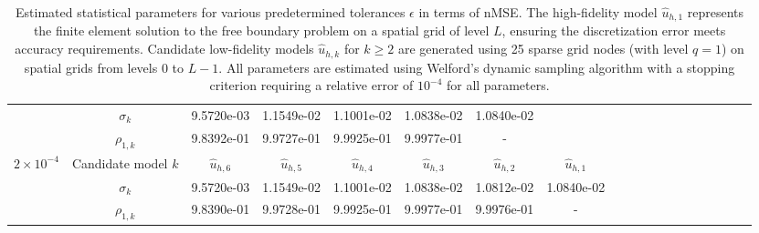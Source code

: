 \begin{table}[ht]
{\begin{tabular}{|c|c|c|c|c|c|c|c|c|c|c|c|c|c|c|c|c|c|c|}
 \cline{2-7}	
&\multicolumn{1}{|c|}{$\sigma_{k}$}&9.5720e-03   &1.1549e-02   &1.1001e-02   &1.0838e-02   &1.0840e-02  &\\
\cline{2-7}	
&\multicolumn{1}{|c|}{$\rho_{1,k}$}&9.8392e-01 &9.9727e-01 &9.9925e-01 &9.9977e-01 &- &\\
\hline
\hline
\multirow{3}{*}{$2\times 10^{-4}$} &\multicolumn{1}{|c|}{Candidate model $k$} &$\widehat u_{h,6}$&$\widehat u_{h,5}$&$\widehat u_{h,4}$&$\widehat u_{h,3}$&$\widehat u_{h,2}$&$\widehat u_{h,1}$\\
\cline{2-8}
&\multicolumn{1}{|c|}{$\sigma_{k}$}&9.5720e-03   &1.1549e-02   &1.1001e-02   &1.0838e-02   &1.0812e-02  &1.0840e-02\\
\cline{2-8}	
&\multicolumn{1}{|c|}{$\rho_{1,k}$}&9.8390e-01   &9.9728e-01   &9.9925e-01   &9.9977e-01   &9.9976e-01   &-\\
\hline
\end{tabular}}
\caption{Estimated statistical parameters for various predetermined tolerances $\epsilon$ in terms of nMSE. The high-fidelity model $\widehat u_{h,1}$ represents the finite element solution to the free boundary problem on a spatial grid of level $L$, ensuring the discretization error meets accuracy requirements. Candidate low-fidelity models $\widehat u_{h,k}$ for $k \geq 2$ are generated using 25 sparse grid nodes (with level $q=1$) on spatial grids from levels 0 to $L-1$. All parameters are estimated using Welford's dynamic sampling algorithm with a stopping criterion requiring a relative error of $10^{-4}$ for all parameters.}
\label{Tab:MFMC_parameters}
\end{table}
%



